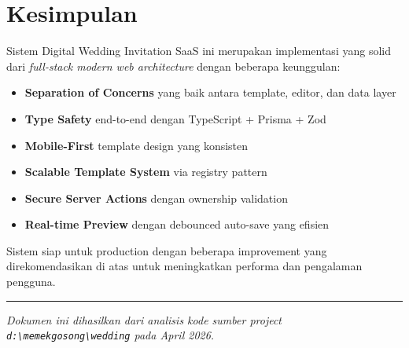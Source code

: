\documentclass[12pt,a4paper]{article}
\begin{document}
\section{Kesimpulan}

Sistem Digital Wedding Invitation SaaS ini merupakan implementasi yang
solid dari \textit{full-stack modern web architecture} dengan beberapa keunggulan:

\begin{itemize}
  \item \textbf{Separation of Concerns} yang baik antara template, editor, dan data layer
  \item \textbf{Type Safety} end-to-end dengan TypeScript + Prisma + Zod
  \item \textbf{Mobile-First} template design yang konsisten
  \item \textbf{Scalable Template System} via registry pattern
  \item \textbf{Secure Server Actions} dengan ownership validation
  \item \textbf{Real-time Preview} dengan debounced auto-save yang efisien
\end{itemize}

Sistem siap untuk production dengan beberapa improvement yang direkomendasikan
di atas untuk meningkatkan performa dan pengalaman pengguna.

\vspace{1cm}
\hrule
\vspace{0.3cm}
\noindent\small\textit{Dokumen ini dihasilkan dari analisis kode sumber project
\texttt{d:\textbackslash memekgosong\textbackslash wedding} pada April 2026.}
\end{document}
